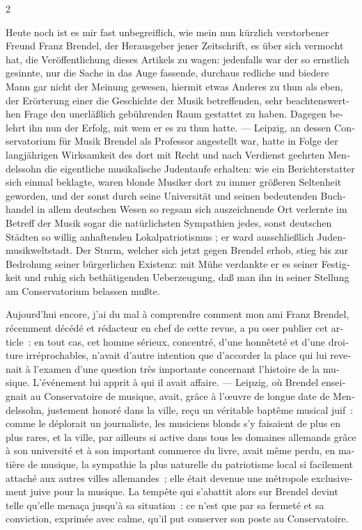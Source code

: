 \documentclass[a4paper,12pt]{article}
\newcommand\chunks[2]{%
\begin{leftcolumn*}\begin{otherlanguage}{german}%
{#1}%
\end{otherlanguage}\end{leftcolumn*}%
\begin{rightcolumn}\begin{otherlanguage}{french}%
{#2}%
\end{otherlanguage}\end{rightcolumn}%
}
\begin{document}
\begin{paracol}{2}
  \chunks{Heute noch ist es mir fast unbegreiflich, wie mein nun kürzlich verstorbener Freund Franz Brendel, der Herausgeber jener Zeitschrift, es über sich vermocht hat, die Veröffentlichung dieses Artikels zu wagen: jedenfalls war der so ernstlich gesinnte, nur die Sache in das Auge fassende, durchaus redliche und biedere Mann gar nicht der Meinung gewesen, hiermit etwas Anderes zu thun als eben, der Erörterung einer die Geschichte der Musik betreffenden, sehr beachtenswerthen Frage den unerläßlich gebührenden Raum gestattet zu haben. Dagegen belehrt ihn nun der Erfolg, mit wem er es zu thun hatte. --- Leipzig, an dessen Conservatorium für Musik Brendel als Professor angestellt war, hatte in Folge der langjährigen Wirksamkeit des dort mit Recht und nach Verdienst geehrten Mendelssohn die eigentliche musikalische Judentaufe erhalten: wie ein Berichterstatter sich einmal beklagte, waren blonde Musiker dort zu immer größeren Seltenheit geworden, und der sonst durch seine Universität und seinen bedeutenden Buchhandel in allem deutschen Wesen so regsam sich auszeichnende Ort verlernte im Betreff der Musik sogar die natürlichsten Sympathien jedes, sonst deutschen Städten so willig anhaftenden Lokalpatriotismus ; er ward ausschließlich Judenmusikweltstadt. Der Sturm, welcher sich jetzt gegen Brendel erhob, stieg bis zur Bedrohung seiner bürgerlichen Existenz: mit Mühe verdankte er es seiner Festigkeit und ruhig sich bethätigenden Ueberzeugung, daß man ihn in seiner Stellung am Conservatorium belassen mußte.}
         {Aujourd’hui encore, j’ai du mal à comprendre comment mon ami Franz Brendel, récemment décédé et rédacteur en chef de cette revue, a pu oser publier cet article : en tout cas, cet homme sérieux, concentré, d’une honnêteté et d’une droiture irréprochables, n’avait d’autre intention que d’accorder la place qui lui revenait à l’examen d’une question très importante concernant l’histoire de la musique. L’événement lui apprit à qui il avait affaire. --- Leipzig, où Brendel enseignait au Conservatoire de musique, avait, grâce à l’œuvre de longue date de Mendelssohn, justement honoré dans la ville, reçu un véritable baptême musical juif : comme le déplorait un journaliste, les musiciens blonds s’y faisaient de plus en plus rares, et la ville, par ailleurs si active dans tous les domaines allemands grâce à son université et à son important commerce du livre, avait même perdu, en matière de musique, la sympathie la plus naturelle du patriotisme local si facilement attaché aux autres villes allemandes ; elle était devenue une métropole exclusivement juive pour la musique. La tempête qui s’abattit alors sur Brendel devint telle qu’elle menaça jusqu’à sa situation : ce n’est que par sa fermeté et sa conviction, exprimée avec calme, qu’il put conserver son poste au Conservatoire.}

\end{paracol}
\end{document}
